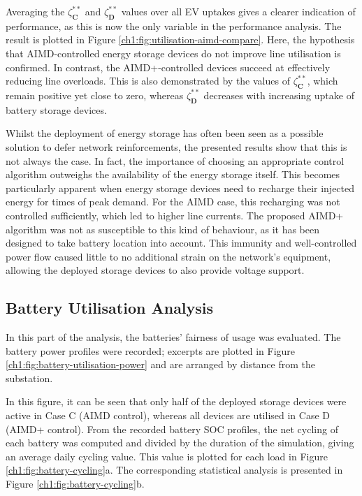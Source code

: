 Averaging the $\zeta_\textbf{C}^{**}$ and $\zeta_\textbf{D}^{**}$ values over all EV uptakes gives a clearer indication of performance, as this is now the only variable in the performance analysis. The result is plotted in Figure \ref{ch1:fig:utilisation-aimd-compare}. Here, the hypothesis that AIMD-controlled energy storage devices do not improve line utilisation is confirmed. In contrast, the AIMD+-controlled devices succeed at effectively reducing line overloads. This is also demonstrated by the values of $\zeta_\textbf{C}^{**}$, which remain positive yet close to zero, whereas $\zeta_\textbf{D}^{**}$ decreases with increasing uptake of battery storage devices.



Whilst the deployment of energy storage has often been seen as a possible solution to defer network reinforcements, the presented results show that this is not always the case. In fact, the importance of choosing an appropriate control algorithm outweighs the availability of the energy storage itself. This becomes particularly apparent when energy storage devices need to recharge their injected energy for times of peak demand. For the AIMD case, this recharging was not controlled sufficiently, which led to higher line currents. The proposed AIMD+ algorithm was not as susceptible to this kind of behaviour, as it has been designed to take battery location into account. This immunity and well-controlled power flow caused little to no additional strain on the network's equipment, allowing the deployed storage devices to also provide voltage support.

\subsection{Battery Utilisation Analysis}

In this part of the analysis, the batteries' fairness of usage was evaluated. The battery power profiles were recorded; excerpts are plotted in Figure \ref{ch1:fig:battery-utilisation-power} and are arranged by distance from the substation.



In this figure, it can be seen that only half of the deployed storage devices were active in Case {C} (AIMD control), whereas all devices are utilised in Case {D} (AIMD+ control). From the recorded battery SOC profiles, the net cycling of each battery was computed and divided by the duration of the simulation, giving an average daily cycling value. This value is plotted for each load in Figure \ref{ch1:fig:battery-cycling}a. The corresponding statistical analysis is presented in Figure \ref{ch1:fig:battery-cycling}b.

